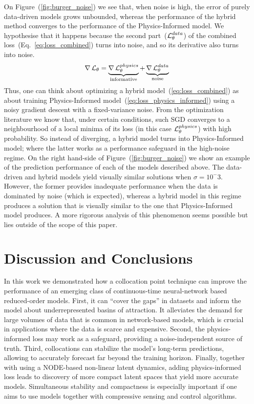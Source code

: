 On Figure~(\ref{fig:burger_noise}) we see that, when noise is high, the error of purely data-driven models grows unbounded, whereas the performance of the hybrid method converges to the performance of the Physics-Informed model. We hypothesise that it happens because the second part~($\operatorname{\mathcal{L}}_{\theta}^{data}$) of the combined loss~(Eq.~\ref{eq:loss_combined}) turns into noise, and so its derivative also turns into noise.
\begin{equation}
    \nabla \operatorname{\mathcal{L}}_{\theta} = \underbrace{\nabla\operatorname{\mathcal{L}}_{\theta}^{physics}}_{\text{informative}} + \underbrace{\nabla\operatorname{\mathcal{L}}_{\theta}^{data}}_{\text{noise}}
\end{equation}
Thus, one can think about optimizing a hybrid model~(\ref{eq:loss_combined}) as about training Physics-Informed model~(\ref{eq:loss_physics_informed}) using a noisy gradient descent with a fixed-variance noise. From the optimization literature \cite{friedlander2012hybrid,patel2021global,shapiro2021lectures} we know that, under certain conditions, such SGD converges to a neighbourhood of a local minima of its loss (in this case $\operatorname{\mathcal{L}}_{\theta}^{physics}$) with high probability. So instead of diverging, a hybrid model turns into Physics-Informed model; where the latter works as a performance safeguard in the high-noise regime.  On the right hand-side of Figure~(\ref{fig:burger_noise}) we show an example of the prediction performance of each of the models described above. The data-driven and hybrid models yield visually similar solutions when $\sigma = 10^-3$. However, the former provides inadequate performance when the data is dominated by noise (which is expected), whereas a hybrid model in this regime produces a solution that is visually similar to the one that Physics-Informed model produces. A more rigorous analysis of this phenomenon seems possible but lies outside of the scope of this paper.


\section{Discussion and Conclusions}

In this work we demonstrated how a collocation point technique can improve the performance of an emerging class of continuous-time neural-network based reduced-order models. First, it can ``cover the gaps'' in datasets and inform the model about underrepresented basins of attraction. It alleviates the demand for large volumes of data that is common in network-based models, which is crucial in applications where the data is scarce and expensive. Second, the physics-informed loss may work as a safeguard, providing a noise-independent source of truth.
Third, collocations can stabilize the model's long-term predictions, allowing to accurately forecast far beyond the training horizon. Finally, together with using a NODE-based non-linear latent dynamics, adding physics-informed loss leads to discovery of more compact latent spaces that yield more accurate models. Simultaneous stability and compactness is especially important if one aims to use models together with compressive sensing and control algorithms.

